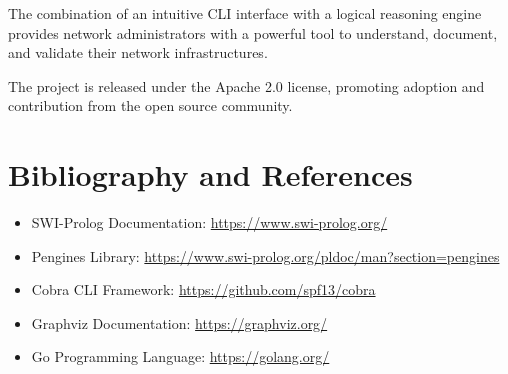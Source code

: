 \documentclass[12pt,a4paper]{article}
\begin{document}
The combination of an intuitive CLI interface with a logical reasoning engine provides network administrators with a powerful tool to understand, document, and validate their network infrastructures.

The project is released under the Apache 2.0 license, promoting adoption and contribution from the open source community.

\section{Bibliography and References}

\begin{itemize}
    \item SWI-Prolog Documentation: \url{https://www.swi-prolog.org/}
    \item Pengines Library: \url{https://www.swi-prolog.org/pldoc/man?section=pengines}
    \item Cobra CLI Framework: \url{https://github.com/spf13/cobra}
    \item Graphviz Documentation: \url{https://graphviz.org/}
    \item Go Programming Language: \url{https://golang.org/}
\end{itemize}

\appendix
\end{document}
